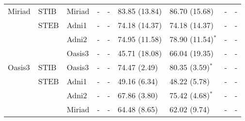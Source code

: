 \begin{table*}
{\begin{tabular}{lllllllll}
\toprule
Miriad &         STIB    & Miriad         &              -       &             -          &  83.85 (13.84) &  86.70 (15.68)        &             - &             -         \\
\cmidrule(lr){2-9}
       &         STEB    & Adni1          &              -       &             -          &  74.18 (14.37) &  74.18 (14.37)        &             - &             -         \\
       &                 & Adni2          &              -       &             -          &  74.95 (11.58) &  78.90 (11.54)$^{*}$  &             - &             -         \\
       &                 & Oasis3         &              -       &             -          &  45.71 (18.08) &  66.04 (19.35)        &             - &             -         \\
\toprule
Oasis3 &         STIB    & Oasis3         &              -       &             -          &   74.47 (2.49) &   80.35 (3.59)$^{*}$  &             - &             -         \\
\cmidrule(lr){2-9}
       &         STEB    & Adni1          &              -       &             -          &   49.16 (6.34) &   48.22 (5.78)        &             - &             -         \\
       &                 & Adni2          &              -       &             -          &   67.86 (3.80) &   75.42 (4.68)$^{*}$  &             - &             -         \\
       &                 & Miriad         &              -       &             -          &   64.48 (8.65) &   62.02 (9.74)        &             - &             -         \\
\bottomrule
\end{tabular}}
\end{table*}

